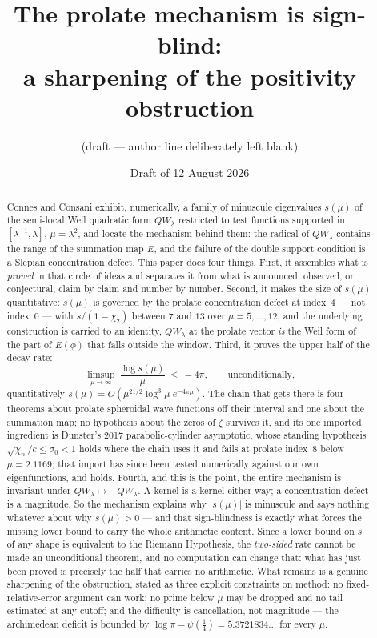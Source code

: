\documentclass[11pt,a4paper]{article}
\title{The prolate mechanism is sign-blind:\\
a sharpening of the positivity obstruction}
\author{\normalsize (draft --- author line deliberately left blank)}
\date{Draft of 12 August 2026}
\theoremstyle{plain}
\theoremstyle{definition}
\theoremstyle{remark}
\newcommand{\R}{\mathbb{R}}
\newcommand{\Z}{\mathbb{Z}}
\newcommand{\Q}{\mathbb{Q}}
\newcommand{\A}{\mathbb{A}}
\newcommand{\E}{\mathcal{E}}
\newcommand{\F}{\mathcal{F}}
\newcommand{\QW}{QW}
\def\QW{QW}\def\E{E}\def\F{F}\def\R{R}\def\Q{Q}\def\Z{Z}\def\A{A}%
\begin{document}
\maketitle

\begin{abstract}
\noindent
Connes and Consani exhibit, numerically, a family of minuscule eigenvalues
$s(\mu)$ of the semi-local Weil quadratic form $\QW_\lambda$ restricted to test
functions supported in $[\lambda^{-1},\lambda]$, $\mu=\lambda^2$, and locate the
mechanism behind them: the radical of $\QW_\lambda$ contains the range of the
summation map $\E$, and the failure of the double support condition is a
Slepian concentration defect.  This paper does four things.  First, it
assembles what is \emph{proved} in that circle of ideas and separates it from
what is announced, observed, or conjectural, claim by claim and number by
number.  Second, it makes the size of $s(\mu)$ quantitative: $s(\mu)$ is
governed by the prolate concentration defect at index~$4$ --- not index~$0$ ---
with $s/(1-\chi_2)$ between $7$ and $13$ over $\mu=5,\dots,12$, and the
underlying construction is carried to an identity, $\QW_\lambda$ at the prolate
vector \emph{is} the Weil form of the part of $\E(\phi)$ that falls outside the
window.  Third, it proves the upper half of the decay rate:
\[
  \limsup_{\mu\to\infty}\ \frac{\log s(\mu)}{\mu}\ \le\ -4\pi ,
  \qquad\text{unconditionally,}
\]
quantitatively $s(\mu)=O(\mu^{21/2}\log^3\!\mu\;e^{-4\pi\mu})$.  The chain that
gets there is four theorems about prolate spheroidal wave functions off their
interval and one about the summation map; no hypothesis about the zeros of
$\zeta$ survives it, and its one imported ingredient is Dunster's 2017
parabolic-cylinder asymptotic, whose standing hypothesis
$\sqrt{\chi_n}/c\le\sigma_0<1$ holds where the chain uses it and fails at
prolate index~$8$ below $\mu=2.1169$; that import has since been tested
numerically against our own eigenfunctions, and holds.  Fourth, and this is the point, the entire mechanism is
invariant under $\QW_\lambda\mapsto-\QW_\lambda$.  A kernel is a kernel either
way; a concentration defect is a magnitude.  So the mechanism explains why
$|s(\mu)|$ is minuscule and says nothing whatever about why $s(\mu)>0$ --- and
that sign-blindness is exactly what forces the missing lower bound to carry the
whole arithmetic content.  Since a lower bound on $s$ of any shape is equivalent
to the Riemann Hypothesis, the \emph{two-sided} rate cannot be made an
unconditional theorem, and no computation can change that: what has just been
proved is precisely the half that carries no arithmetic.  What remains is a genuine
sharpening of the obstruction, stated as three explicit constraints on method:
no fixed-relative-error argument can work; no prime below $\mu$ may be dropped
and no tail estimated at any cutoff; and the difficulty is cancellation, not
magnitude --- the archimedean deficit is bounded by
$\log\pi-\psi(\tfrac14)=5.3721834\ldots$ for every $\mu$.
\end{abstract}
\end{document}
